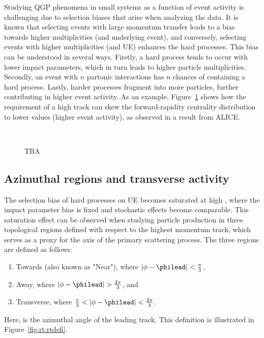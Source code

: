 Studying QGP phenomena in small systems as a function of event activity is challenging due to selection biases that arise when analyzing the data. It is known that selecting events with large momentum transfer leads to a bias towards higher multiplicities (and underlying event), and conversely, selecting events with higher multiplicities (and UE) enhances the hard processes. This bias can be understood in several ways. Firstly, a hard process tends to occur with lower impact parameters, which in turn leads to higher particle multiplicities. Secondly, an event with $n$ partonic interactions has $n$ chances of containing a hard process. Lastly, harder processes fragment into more particles, further contributing in higher event activity. As an example, Figure~\ref{fig:rt:hardbias} shows how the requirement of a high \pt track can skew the forward-rapidity centrality distribution to lower values (higher event activity), as observed in a result from ALICE.

\begin{figure}%
\\
\caption{TBA}
\label{fig:rt:hardbias}
\end{figure}

\subsection{Azimuthal regions and transverse activity}

The selection bias of hard processes on UE becomes saturated at high \pt, where the impact parameter bias is fixed and stochastic effects become comparable. This saturation effect can be observed when studying particle production in three topological regions defined with respect to the highest momentum track, which serves as a proxy for the axis of the primary scattering process. The three regions are defined as follows:
\begin{enumerate}
\item Towards (also known as "Near"), where $|\phi - \philead| < \frac{\pi}{3}$,
\item Away, where $|\phi - \philead| > \frac{2\pi}{3}$, and 
\item Transverse, where $\frac{\pi}{3} < |\phi - \philead| < \frac{2\pi}{3}$. 
\end{enumerate}
Here, \philead is the azimuthal angle of the leading track. This definition is illustrated in Figure~\ref{fig:rt:rtdefi}. 

